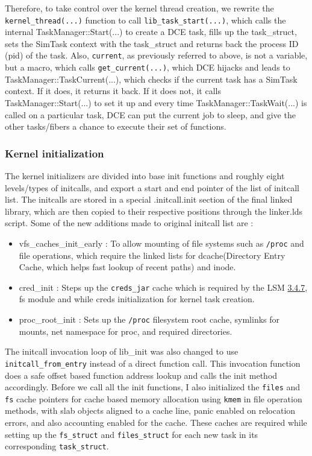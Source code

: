 \documentclass{sig-alternate}
\begin{document}
\sloppy Therefore, to take  control over the kernel thread creation, we rewrite the \texttt{kernel\_thread(...)} function to call 
\texttt{lib\_task\_start(...)}, which calls the 
internal TaskManager::Start(...) to create a DCE task, fills up the task\_struct, sets the SimTask context with the task\_struct and returns back 
the process ID (pid) of the task. Also, \texttt{current}, as previously referred to above, is not a variable, but a macro, which calls \texttt{get\_current(...)}, which DCE hijacks and leads to TaskManager::TaskCurrent(...), which checks if the current task has a SimTask context. If it does, it returns it back. 
If it does not, it calls TaskManager::Start(...) to set it up and every time 
TaskManager::TaskWait(...)  is called on a particular task, DCE can put the current job to sleep, and give the other tasks/fibers a chance to 
execute their set of functions. 
 
\subsubsection{Kernel initialization}
The kernel initializers are divided into base init functions and roughly eight levels/types of initcalls, and export a start and end pointer of the list of initcall list. 
The initcalls are stored in a special .initcall.init section of the final linked library, which are then copied to their respective positions through the linker.lds script.
Some of the new additions made to original initcall list are : 

\begin{itemize}
  \item vfs\_caches\_init\_early : To allow mounting of file systems such as \texttt{/proc} and file operations, which require the linked lists for 
  dcache(Directory Entry Cache, which helps fast lookup of recent paths) and inode.
  \item cred\_init : Steps up the \texttt{creds\_jar} cache which is required by the LSM \hyperref[Section_LSM]{3.4.7}, fs module and 
  while creds initialization for kernel task creation.
  \item proc\_root\_init : Sets up the \texttt{/proc} filesystem root cache, symlinks for mounts, net namespace for proc, and required directories.
\end{itemize}

The initcall invocation loop of lib\_init was also changed to use \texttt{initcall\_from\_entry} instead of a direct function call. 
This invocation function does a safe offset based function address lookup and calls the init method accordingly. 
Before we call all the init functions, I also initialized the \texttt{files} and \texttt{fs} cache pointers for cache based memory 
allocation using \texttt{kmem} in file operation methods, with slab objects aligned to a cache line, panic enabled on relocation errors, and also accounting enabled 
for the cache. These caches are required while setting up the \texttt{fs\_struct} and \texttt{files\_struct} for each new task in its 
corresponding \texttt{task\_struct}. 
\end{document}
